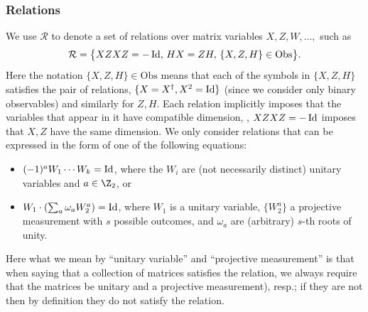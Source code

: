 \documentclass{toc}
\newcommand{\Id}{\ensuremath{\mathop{\rm Id}\nolimits}}
\newcommand{\setft}[1]{\mathrm{#1}}
\newcommand{\Obs}{\setft{Obs}}
\begin{document}
\subsubsection{Relations}

We use $\mathcal{R}$ to denote a set of relations over matrix variables $X,Z,W,\ldots,$ such as
$$\mathcal{R}=\big\{XZXZ=-\Id,\, HX=ZH,\,\{X,Z,H\}\in\Obs\big\}.$$
Here the notation $\{X,Z,H\}\in\Obs$ means that each of the symbols in $\{X,Z,H\}$ satisfies the pair of relations, $\{X=X^\dagger,X^2=\Id\}$ (since we consider only binary observables) and similarly for $Z,H$. Each relation implicitly imposes that the variables that appear in it have compatible dimension, 
\eg, $XZXZ=-\Id$ imposes that $X,Z$ have the same dimension. 
We only consider relations that can be expressed in the form of  one of the following
equations:
\begin{itemize}
  \item  $(-1)^a W_1\cdots W_k = \Id$, where the $W_i$ are (not necessarily distinct) unitary variables and $a\in\Z_2$, or
  \item $ W_1 \cdot ( \sum_a \omega_a W_2^a)=\Id$, where $W_1$ is a unitary variable, $\{W_2^a\}$ a projective measurement with $s$ possible outcomes, and $\omega_a$ are (arbitrary) $s$-th roots of unity.
\end{itemize}
Here what we mean by ``unitary variable''
%
%
and ``projective measurement''  %
is that when saying that a collection of matrices %
satisfies  %
the relation, we always require that the matrices %
be  %
%
unitary and a projective measurement), resp.; %
if they are not then by definition they do not satisfy the relation. 
\end{document}
